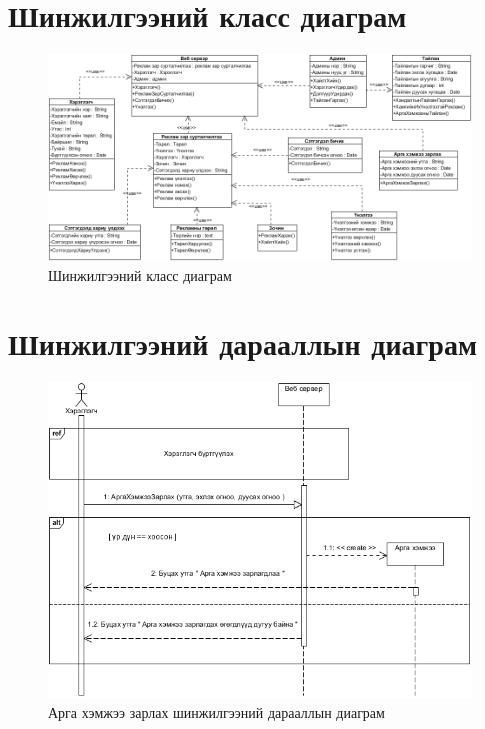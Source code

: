 \section{Шинжилгээний класс диаграм}

\begin{figure}[ht]
	\centering
	\includegraphics[angle=90,scale=0.7]{Diagrams/SClass}
	\caption[Шинжилгээний класс диаграм]{Шинжилгээний класс диаграм}
	\label{fig:SClass}
\end{figure}

\section{Шинжилгээний дарааллын диаграм}
\begin{figure}
	\centering
	\includegraphics[scale=0.7]{Diagrams/arga_hemjee}
	\caption[Арга хэмжээ зарлах шинжилгээний дарааллын диаграм]{Арга хэмжээ зарлах шинжилгээний дарааллын диаграм}
	\label{text}
\end{figure}

